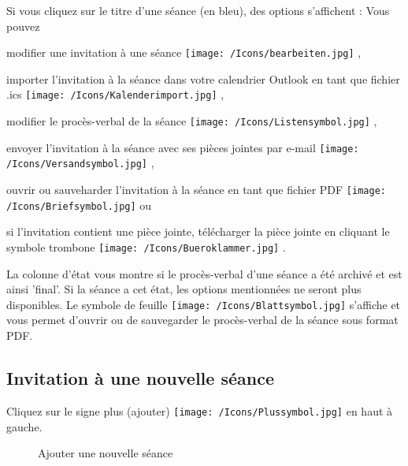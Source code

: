 Si vous cliquez sur le titre d'une séance (en bleu), des options s'affichent  : Vous pouvez 

\begin{compactitem}
\item modifier une invitation à une séance \texttt{[image: /Icons/bearbeiten.jpg]} ,
\item importer l'invitation à la séance dans votre calendrier Outlook en tant que fichier .ics \texttt{[image: /Icons/Kalenderimport.jpg]} ,
\item modifier le procès-verbal de la séance \texttt{[image: /Icons/Listensymbol.jpg]} ,
\item envoyer l'invitation à la séance avec ses pièces jointes par e-mail \texttt{[image: /Icons/Versandsymbol.jpg]} ,
\item ouvrir ou sauveharder l'invitation à la séance en tant que fichier PDF \texttt{[image: /Icons/Briefsymbol.jpg]}  ou 
\item si l'invitation contient une pièce jointe, télécharger la pièce jointe en cliquant le symbole trombone \texttt{[image: /Icons/Bueroklammer.jpg]} .
\end{compactitem}

\vspace{\baselineskip}

La colonne d'état  vous montre si le procès-verbal d'une séance a été archivé et est ainsi 'final'. Si la séance a cet état, les options mentionnées ne seront plus disponibles. Le symbole de feuille \texttt{[image: /Icons/Blattsymbol.jpg]} s'affiche et vous permet d'ouvrir ou de sauvegarder le procès-verbal de la séance sous format PDF.

\subsection{Invitation à une nouvelle séance}
\label{bkm:Ref434828480}

Cliquez sur le signe plus (ajouter) \texttt{[image: /Icons/Plussymbol.jpg]}  en haut à gauche.

\vspace{\baselineskip}

\begin{figure}[H]
\caption{Ajouter une nouvelle séance}
\end{figure}


